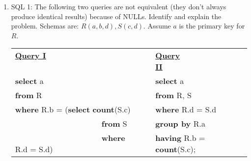 \documentclass[11pt]{article}
\newcommand{\answer}[2]{\noindent {\bf Answer:} #2}
\renewcommand{\answer}[2]{\vspace{#1}}
\begin{document}
\begin{enumerate}
\begin{itemize}
                \answer{.8in}{Just reverse what we did to create the ``cyclic'' integrity constraints above. First alter the table ``r'' to 
                remove the referential integrity constraint, and then delete ``t'', and then ``s'', and finally ``r''.}
        \end{itemize}

\item SQL 1: The following two queries are not equivalent (they don't always produce identical results) because of NULLs. Identify and explain the problem. Schemas are: $R(a, b, d), S( c, d)$.  Assume $a$ is the primary key for $R$.

\begin{table}[h]
\begin{center}
\begin{tabular}{|l|ll|}
    \hline
\underline{\bf Query I} \mbox{\ \ \ \ \ \ \ \ \ \ \ \ }\mbox{\ \ \ \ \ \ \ \ \ \ \ \ }&& \underline{\bf Query II}\mbox{\ \ \ \ \ \ \ \ \ \ \
\ }\mbox{\ \ \ \ \ \ } \\
{\bf select} a &&     {\bf select} a \\
{\bf from} R &&   {\bf from} R, S  \\
{\bf where} R.b = ({\bf select} {\bf count}(S.c) && {\bf where} R.d = S.d  \\
\mbox{\ \ \ \ \ \ \ \ \ \ \ \ \ \ \ \ \ \ \ \ \ \ }{\bf from} S && {\bf group by} R.a \\
\mbox{\ \ \ \ \ \ \ \ \ \ \ \ \ \ \ \ \ \ \ \ \ \ }{\bf where} R.d = S.d) && {\bf having} R.b = {\bf count}(S.c);\\
    \hline
\end{tabular}
\end{center}
\end{table}

\answer{2in}{Consider a tuple in $R$: $(R.a = \alpha, R.b = 0, R.d = \beta)$, and say there is  no tuple in $S$ such that $S.d = \beta$. The first query will generate the answer tuple $\alpha$, whereas the second query will not. }

\end{enumerate}
\end{document}
